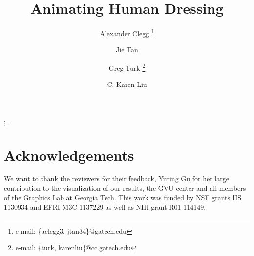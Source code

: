 \documentclass[conference]{acmsiggraph}
\title{Animating Human Dressing}
\author{Alexander Clegg \thanks{e-mail: \{aclegg3, jtan34\}@gatech.edu} \and Jie Tan \footnotemark[1]  %
\and  Greg Turk \thanks{e-mail: \{turk, karenliu\}@cc.gatech.edu}  \and  C. Karen Liu \footnotemark[2] }
\affiliation{Georgia Institute of Technology}
\begin{document}


\maketitle


\begin{abstract}


\end{abstract}
\vspace{-0.15 in}
\begin{CRcatlist}
  ;
  .
\end{CRcatlist}
\vspace{-0.15 in}
\keywordlist
\vspace{-0.2 in}
\copyrightspace


\vspace{0.2 in}








\section*{Acknowledgements}

We want to thank the reviewers for their feedback, Yuting Gu
for her large contribution to the visualization of our results, the GVU center and all members of the Graphics Lab at Georgia Tech. This work was funded by NSF grants IIS 1130934 and EFRI-M3C 1137229 as well as NIH grant R01 114149.




%
\end{document}
